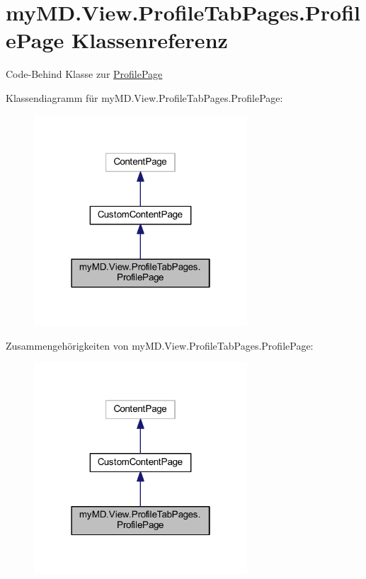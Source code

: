 \hypertarget{classmy_m_d_1_1_view_1_1_profile_tab_pages_1_1_profile_page}{}\section{my\+M\+D.\+View.\+Profile\+Tab\+Pages.\+Profile\+Page Klassenreferenz}
\label{classmy_m_d_1_1_view_1_1_profile_tab_pages_1_1_profile_page}


Code-\/\+Behind Klasse zur \mbox{\hyperlink{classmy_m_d_1_1_view_1_1_profile_tab_pages_1_1_profile_page}{Profile\+Page}}  




Klassendiagramm für my\+M\+D.\+View.\+Profile\+Tab\+Pages.\+Profile\+Page\+:\nopagebreak
\begin{figure}[H]
\begin{center}
\leavevmode
\includegraphics[width=226pt]{classmy_m_d_1_1_view_1_1_profile_tab_pages_1_1_profile_page__inherit__graph}
\end{center}
\end{figure}


Zusammengehörigkeiten von my\+M\+D.\+View.\+Profile\+Tab\+Pages.\+Profile\+Page\+:\nopagebreak
\begin{figure}[H]
\begin{center}
\leavevmode
\includegraphics[width=226pt]{classmy_m_d_1_1_view_1_1_profile_tab_pages_1_1_profile_page__coll__graph}
\end{center}
\end{figure}
